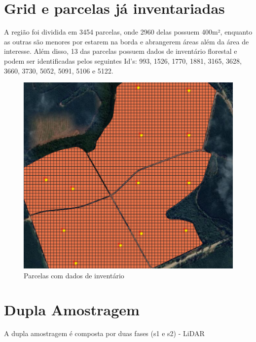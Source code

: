 \documentclass[
]{article}
\begin{document}
\newpage

\section{Grid e parcelas já
inventariadas}\label{grid-e-parcelas-juxe1-inventariadas}

A região foi dividida em 3454 parcelas, onde 2960 delas possuem 400m²,
enquanto as outras são menores por estarem na borda e abrangerem áreas
além da área de interesse. Além disso, 13 das parcelas possuem dados de
inventário florestal e podem ser identificadas pelos seguintes Id's:
993, 1526, 1770, 1881, 3165, 3628, 3660, 3730, 5052, 5091, 5106 e 5122.

\begin{figure}

{\centering \includegraphics[width=0.4\linewidth]{IMAGES/parcelasinventariadas} 

}

\caption{Parcelas com dados de inventário}\label{fig:unnamed-chunk-5}
\end{figure}
\newpage

\section{Dupla Amostragem}\label{dupla-amostragem}

A dupla amostragem é composta por duas fases (s1 e s2) - LiDAR
\end{document}
